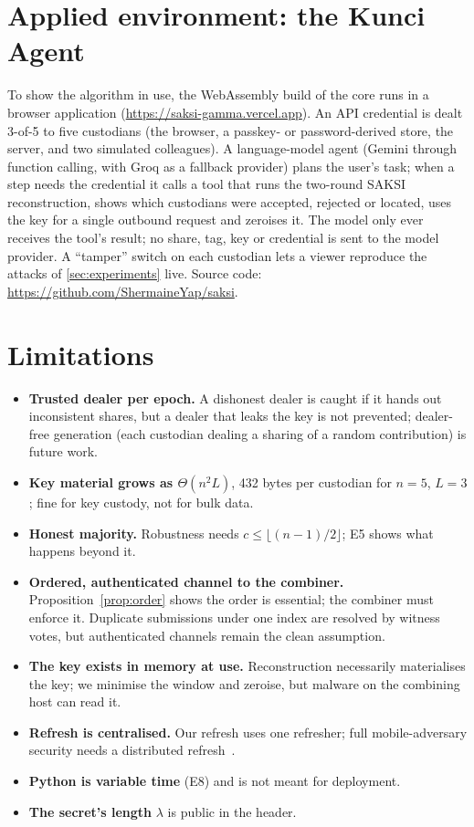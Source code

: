 \documentclass[11pt,a4paper]{article}
\newcommand{\demourl}{https://saksi-gamma.vercel.app}
\newcommand{\repourl}{https://github.com/ShermaineYap/saksi}
\theoremstyle{plain}
\theoremstyle{definition}
\begin{document}
\section{Applied environment: the Kunci Agent}\label{sec:applied}

To show the algorithm in use, the WebAssembly build of the core runs in a browser application
(\url{\demourl}). An API credential is dealt 3-of-5 to five custodians (the browser, a passkey- or
password-derived store, the server, and two simulated colleagues). A language-model agent (Gemini
through function calling, with Groq as a fallback provider) plans the user's task; when a step
needs the credential it calls a tool that runs the two-round SAKSI reconstruction, shows which
custodians were accepted, rejected or located, uses the key for a single outbound request and
zeroises it. The model only ever receives the tool's result; no share, tag, key or credential is
sent to the model provider. A ``tamper'' switch on each custodian lets a viewer reproduce the
attacks of \cref{sec:experiments} live. Source code: \url{\repourl}.

\section{Limitations}\label{sec:limits}
\begin{itemize}
  \item \textbf{Trusted dealer per epoch.} A dishonest dealer is caught if it hands out inconsistent
  shares, but a dealer that leaks the key is not prevented; dealer-free generation (each custodian
  dealing a sharing of a random contribution) is future work.
  \item \textbf{Key material grows as $\Theta(n^2L)$}, 432 bytes per custodian for $n=5$, $L=3$; fine
  for key custody, not for bulk data.
  \item \textbf{Honest majority.} Robustness needs $c\le\lfloor(n-1)/2\rfloor$; E5 shows what happens
  beyond it.
  \item \textbf{Ordered, authenticated channel to the combiner.} Proposition~\ref{prop:order} shows the
  order is essential; the combiner must enforce it. Duplicate submissions under one index are
  resolved by witness votes, but authenticated channels remain the clean assumption.
  \item \textbf{The key exists in memory at use.} Reconstruction necessarily materialises the key; we
  minimise the window and zeroise, but malware on the combining host can read it.
  \item \textbf{Refresh is centralised.} Our refresh uses one refresher; full mobile-adversary security
  needs a distributed refresh~\cite{herzberg95}.
  \item \textbf{Python is variable time} (E8) and is not meant for deployment.
  \item \textbf{The secret's length} $\lambda$ is public in the header.
\end{itemize}
\end{document}
